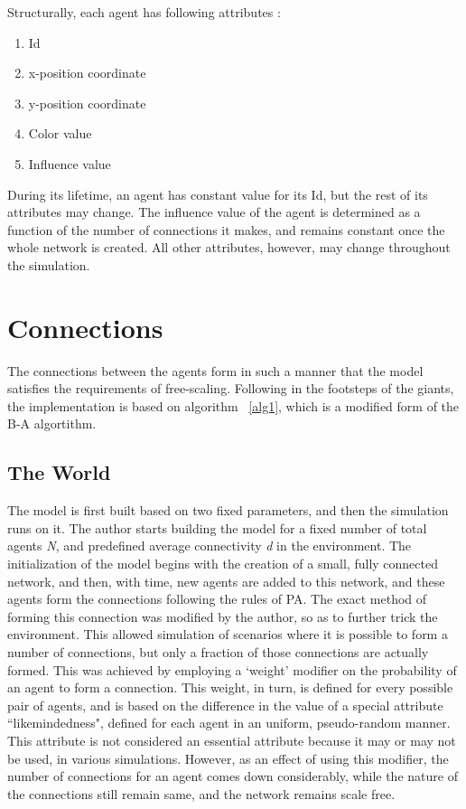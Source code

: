 Structurally, each agent has following attributes :

\begin{enumerate}
\item Id
\item x-position coordinate
\item y-position coordinate
\item Color value
\item Influence value
\end{enumerate}

During its lifetime, an agent has constant value for its Id, but the rest of its attributes may change. The influence value of the agent is determined as a function of the number of connections it makes, and remains constant once the whole network is created. All other attributes, however, may change throughout the simulation.


\section{Connections}
The connections between the agents form in such a manner that the model satisfies the requirements of free-scaling. 
Following in the footsteps of the giants, the implementation is based on algorithm ~\ref{alg1}, which is a modified form of the B-A algortithm.

\subsection{The World}
The model is first built based on two fixed parameters, and then the simulation runs on it.
The author starts building the model for a fixed number of total agents \emph{N}, and predefined average connectivity \emph{d} in the environment.
The initialization of the model begins with the creation of a small, fully connected network, and then, with time, new agents are added to this network, and these agents form the connections following the rules of PA.
The exact method of forming this connection was modified by the author, so as to further trick the environment. This allowed simulation of scenarios where it is possible to form a number of connections, but only a fraction of those connections are actually formed. This was achieved by employing a `weight' modifier on the probability of an agent to form a connection. This weight, in turn, is defined for every possible pair of agents, and is based on the difference in the value of a special attribute ``likemindedness", defined for each agent in an uniform, pseudo-random manner.
This attribute is not considered an essential attribute because it may or may not be used, in various simulations. However, as an effect of using this modifier, the number of connections for an agent comes down considerably, while the nature of the connections still remain same, and the network remains scale free.


